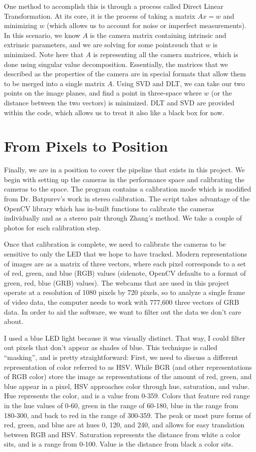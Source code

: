 \documentclass[
    12pt,
    twoside,
    bibstyle=chicago,
    headerstyle=uppercase,
	bibfile=thesis_updating.bib
]{reedthesis}
\begin{document}
	One method to accomplish this is through a process called Direct Linear Transformation. At its core, it is the process of taking a matrix $Ax = w$ and minimizing $w$ (which allows us to account for noise or imperfect measurements). In this scenario, we know $A$ is the camera matrix containing intrinsic and extrinsic parameters, and we are solving for some point$x$such that $w$ is minimized. Note here that $A$ is representing all the camera matrices, which is done using singular value decomposition. Essentially, the matrices that we described as the properties of the camera are in special formats that allow them to be merged into a single matrix $A$. Using SVD and DLT, we can take our two points on the image planes, and find a point in three-space where $w$ (or the distance between the two vectors) is minimized. DLT and SVD are provided within the code, which allows us to treat it also like a black box for now.

\section{From Pixels to Position}
Finally, we are in a position to cover the pipeline that exists in this project. We begin with setting up the cameras in the performance space and calibrating the cameras to the space. The program contains a calibration mode which is modified from Dr. Batpurev's work in stereo calibration. The script takes advantage of the OpenCV library which has in-built functions to calibrate the cameras individually and as a stereo pair through Zhang's method. We take a couple of photos for each calibration step.

Once that calibration is complete, we need to calibrate the cameras to be sensitive to only the LED that we hope to have tracked. Modern representations of images are as a matrix of three vectors, where each pixel corresponds to a set of red, green, and blue (RGB) values (sidenote, OpenCV defaults to a format of green, red, blue (GRB) values). The webcams that are used in this project operate at a resolution of 1080 pixels by 720 pixels, so to analyze a single frame of video data, the computer needs to work with 777,600 three vectors of GRB data. In order to aid the software, we want to filter out the data we don't care about.

I used a blue LED light because it was visually distinct. That way, I could filter out pixels that don't appear as shades of blue. This technique is called “masking”, and is pretty straightforward: First, we need to discuss a different representation of color referred to as HSV. While BGR (and other representations of RGB color) store the image as representations of the amount of red, green, and blue appear in a pixel, HSV approaches color through hue, saturation, and value. Hue represents the color, and is a value from 0-359. Colors that feature red range in the hue values of 0-60, green in the range of 60-180, blue in the range from 180-300, and back to red in the range of 300-359. The peak or most pure forms of red, green, and blue are at hues 0, 120, and 240, and allows for easy translation between RGB and HSV. Saturation represents the distance from white a color sits, and is a range from 0-100. Value is the distance from black a color sits.
\end{document}
